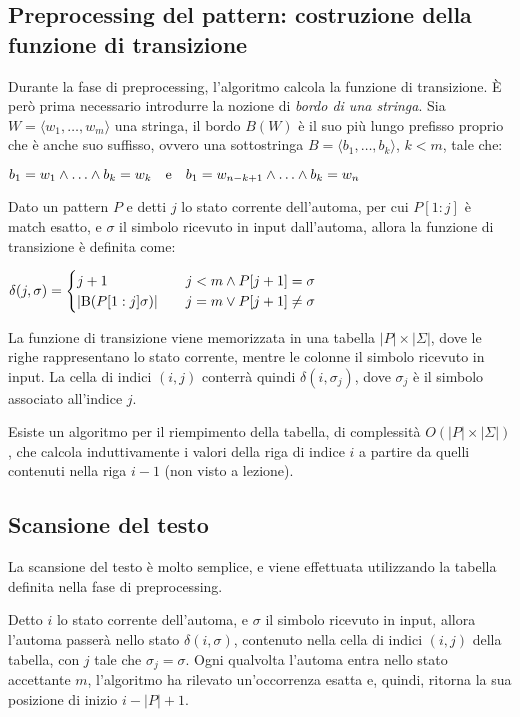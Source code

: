 \subsection{Preprocessing del pattern: costruzione della funzione di transizione}
Durante la fase di preprocessing, l'algoritmo calcola la funzione di transizione.
È però prima necessario introdurre la nozione di \textit{bordo di una stringa}. Sia $W = \langle w_1, \ldots, w_m \rangle$ una stringa, il bordo $B(W)$ è il suo più lungo prefisso proprio che è anche suo suffisso, ovvero una sottostringa $B = \langle b_1, \ldots, b_k \rangle$, $k < m$, tale che:
\begin{center}
    $b_1 = w_1 \land \ldots \land b_k = w_k \quad \textnormal{e} \quad b_1 = w_{n-k+1} \land \ldots \land b_k = w_n$
\end{center} 
Dato un pattern $P$ e detti $j$ lo stato corrente dell'automa, per cui $P[1:j]$ è match esatto, e $\sigma$ il simbolo ricevuto in input dall'automa, allora la funzione di transizione è definita come:
\begin{center}
    $\delta (j, \sigma) = \begin{cases}
        j+1 & \quad j < m \land P[j+1] = \sigma \\
        \vert \textnormal{B}(P[1:j]\sigma) \vert & \quad j = m \lor P[j+1] \neq \sigma 
    \end{cases}$
\end{center}
La funzione di transizione viene memorizzata in una tabella $|P| \times |\Sigma|$, dove le righe rappresentano lo stato corrente, mentre le colonne il simbolo ricevuto in input.
La cella di indici $(i, j)$ conterrà quindi $\delta (i, \sigma_j)$, dove $\sigma_j$ è il simbolo associato all'indice $j$.

Esiste un algoritmo per il riempimento della tabella, di complessità $O(|P| \times |\Sigma|)$, che calcola induttivamente i valori della riga di indice $i$ a partire da quelli contenuti nella riga $i-1$ (non visto a lezione). 

\subsection{Scansione del testo}
La scansione del testo è molto semplice, e viene effettuata utilizzando la tabella definita nella fase di preprocessing.

Detto $i$ lo stato corrente dell'automa, e $\sigma$ il simbolo ricevuto in input, allora l'automa passerà nello stato $\delta (i, \sigma)$, contenuto nella cella di indici $(i, j)$ della tabella, con $j$ tale che $\sigma_j = \sigma$.
Ogni qualvolta l'automa entra nello stato accettante $m$, l'algoritmo ha rilevato un'occorrenza esatta e, quindi, ritorna la sua posizione di inizio $i - |P| + 1$.

